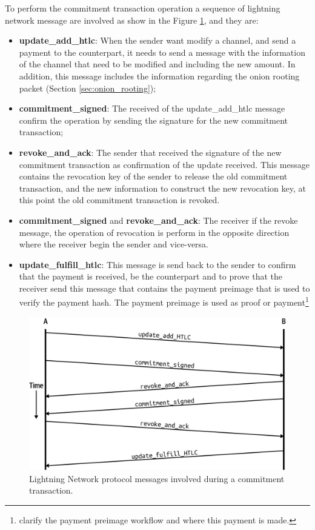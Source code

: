 To perform the commitment transaction operation a sequence of lightning network message are involved as show in the Figure \ref{fig:commitment_transaction_ln_messages}, and they are:

\begin{itemize}
  \item {\bf update\_add\_htlc}: When the sender want modify a channel, and send a payment to the counterpart, it needs to send a message with the information of the channel that need to be modified and including the new amount. In addition, this message includes
  the information regarding the onion rooting packet (Section \ref{sec:onion_rooting});
  \item {\bf commitment\_signed}: The received of the update\_add\_htlc message confirm the operation by sending the signature for the new commitment transaction;
  \item {\bf revoke\_and\_ack}: The sender that received the signature of the new commitment transaction as confirmation of the update received. This message contains the revocation key of the sender to release the old commitment transaction, and the new information to construct the new revocation key, at this point the old commitment transaction is revoked.
  \item {\bf commitment\_signed} and {\bf revoke\_and\_ack}: The receiver if the revoke message, the operation of revocation is perform in the opposite direction where the receiver begin the sender and vice-versa.
  \item {\bf update\_fulfill\_htlc}: This message is send back to the sender to confirm that the payment is received, be the counterpart and to prove that the receiver send this message that contains the payment preimage that is used to verify the payment hash. The payment preimage is used as proof or payment\footnote{clarify the payment preimage workflow and where this payment is made.}
\end{itemize}


\begin{figure}[h]
  \begin{center}
  \includegraphics[width=0.6\columnwidth]{imgs/mtln_0903.png}
  \end{center}
  \caption{Lightning Network protocol messages involved during a commitment transaction.}
  \label{fig:commitment_transaction_ln_messages}
\end{figure}


